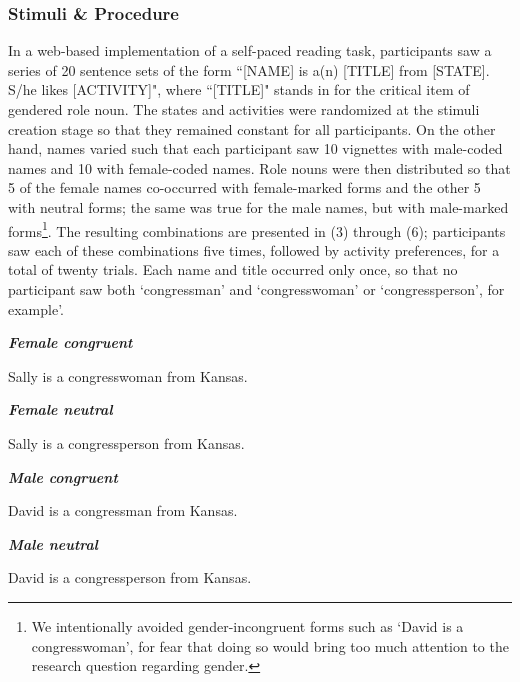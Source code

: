 \documentclass[10pt,letterpaper]{article}
\begin{document}
	\subsubsection{Stimuli \& Procedure} In a web-based implementation of a self-paced reading task, participants saw a series of 20 sentence sets of the form ``[NAME] is a(n) [TITLE] from [STATE]. S/he likes [ACTIVITY]", where ``[TITLE]" stands in for the critical item of gendered role noun. The states and activities were randomized at the stimuli creation stage so that they remained constant for all participants. On the other hand, names varied such that each participant saw 10 vignettes with male-coded names and 10 with female-coded names. Role nouns were then distributed so that 5 of the female names co-occurred with female-marked forms and the other 5 with neutral forms; the same was true for the male names, but with male-marked forms\footnote{We intentionally avoided gender-incongruent forms such as `David is a congresswoman', for fear that doing so would bring too much attention to the research question regarding gender.}. The resulting combinations are presented in (3) through (6); participants saw each of these combinations five times, followed by activity preferences, for a total of twenty trials. Each name and title occurred only once, so that no participant saw both `congressman' and `congresswoman' or `congressperson', for example'.
	
	\begin{exe}
		\ex \textbf{\textit{Female congruent }}
		\begin{xlist}
			\ex Sally is a congresswoman from Kansas.
		\end{xlist}
			\ex \textbf{\textit{Female neutral}}
		\begin{xlist}
			\ex Sally is a congressperson from Kansas. 
			\end{xlist}
				\ex \textbf{\textit{Male congruent }}
		\begin{xlist}
			\ex David is a congressman from Kansas. 
		\end{xlist}
		\ex \textbf{\textit{Male neutral}}
		\begin{xlist}
			\ex David is a congressperson from Kansas. 
		\end{xlist}
	\end{exe}
	
\end{document}
